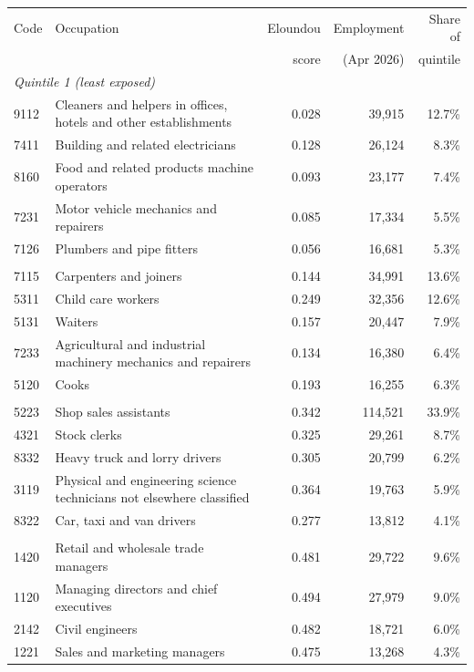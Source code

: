\begin{tabular}{l p{6.2cm} r r r}
\toprule
Code & Occupation & Eloundou & Employment & Share of \\
 & & score & (Apr 2026) & quintile \\
\midrule
\multicolumn{5}{l}{\textit{Quintile 1 (least exposed)}} \\
9112 & Cleaners and helpers in offices, hotels and other establishments & 0.028 & 39,915 & 12.7\% \\
7411 & Building and related electricians & 0.128 & 26,124 & 8.3\% \\
8160 & Food and related products machine operators & 0.093 & 23,177 & 7.4\% \\
7231 & Motor vehicle mechanics and repairers & 0.085 & 17,334 & 5.5\% \\
7126 & Plumbers and pipe fitters & 0.056 & 16,681 & 5.3\% \\
\addlinespace
\multicolumn{5}{l}{\textit{Quintile 2}} \\
7115 & Carpenters and joiners & 0.144 & 34,991 & 13.6\% \\
5311 & Child care workers & 0.249 & 32,356 & 12.6\% \\
5131 & Waiters & 0.157 & 20,447 & 7.9\% \\
7233 & Agricultural and industrial machinery mechanics and repairers & 0.134 & 16,380 & 6.4\% \\
5120 & Cooks & 0.193 & 16,255 & 6.3\% \\
\addlinespace
\multicolumn{5}{l}{\textit{Quintile 3}} \\
5223 & Shop sales assistants & 0.342 & 114,521 & 33.9\% \\
4321 & Stock clerks & 0.325 & 29,261 & 8.7\% \\
8332 & Heavy truck and lorry drivers & 0.305 & 20,799 & 6.2\% \\
3119 & Physical and engineering science technicians not elsewhere classified & 0.364 & 19,763 & 5.9\% \\
8322 & Car, taxi and van drivers & 0.277 & 13,812 & 4.1\% \\
\addlinespace
\multicolumn{5}{l}{\textit{Quintile 4}} \\
1420 & Retail and wholesale trade managers & 0.481 & 29,722 & 9.6\% \\
1120 & Managing directors and chief executives & 0.494 & 27,979 & 9.0\% \\
2142 & Civil engineers & 0.482 & 18,721 & 6.0\% \\
1221 & Sales and marketing managers & 0.475 & 13,268 & 4.3\% \\

\end{tabular}
